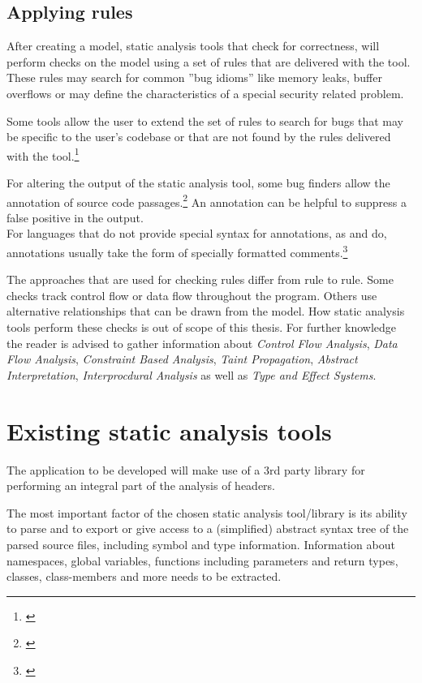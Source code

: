 \subsection{Applying rules}

After creating a model, static analysis tools that check for correctness, will perform checks on the model using a set of rules that are delivered with the tool. These rules may search for common ''bug idioms'' like memory leaks, buffer overflows or may define the characteristics of a special security related problem.

Some tools allow the user to extend the set of rules to search for bugs that may be specific to the user's codebase or that are not found by the rules delivered with the tool.\footnote{\citep[97]{SecureProgramming}}

For altering the output of the static analysis tool, some bug finders allow the annotation of source code passages.\footnote{\citep[99]{SecureProgramming}} An annotation can be helpful to suppress a false positive in the output.
\\For languages that do not provide special syntax for annotations, as  and  do, annotations usually
take the form of specially formatted comments.\footnote{\citep[99]{SecureProgramming}}

The approaches that are used for checking rules differ from rule to rule. Some checks track control flow or data flow throughout the program. Others use alternative relationships that can be drawn from the model. How static analysis tools perform these checks is out of scope of this thesis. For further knowledge the reader is advised to gather information about \textit{Control Flow Analysis}, \textit{Data Flow Analysis}, \textit{Constraint Based Analysis}, \textit{Taint Propagation}, \textit{Abstract Interpretation}, \textit{Interprocdural Analysis }as well as \textit{Type and Effect Systems}. 

\section{Existing static analysis tools}

The application to be developed will make use of a 3rd party library for performing an integral part of the analysis of  headers. 

The most important factor of the chosen static analysis tool/library is its ability to parse  and to export or give access to a (simplified) abstract syntax tree of the parsed source files, including symbol and type information. Information about namespaces, global variables, functions including parameters and return types, classes, class-members and more needs to be extracted.

